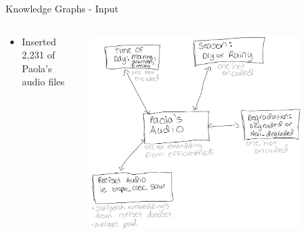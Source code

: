 \begin{frame}{Knowledge Graphs - Input}
    \begin{columns}
        \begin{column}{0.3\textwidth}
            \begin{itemize}
                \item Inserted 2,231 of Paola's audio files
            \end{itemize}
        \end{column}
        \begin{column}{0.7\textwidth}
            \centering
            \includegraphics[height=0.8\textheight,width=0.8\textwidth,keepaspectratio]{images/knowledge_graph.png}
        \end{column}
    \end{columns}
\end{frame}

